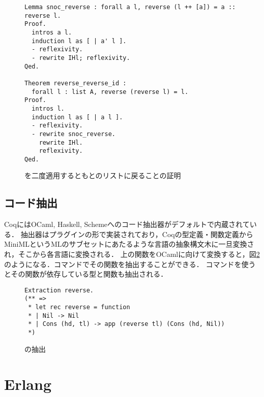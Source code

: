 \begin{figure}
\begin{lstlisting}
Lemma snoc_reverse : forall a l, reverse (l ++ [a]) = a :: reverse l.
Proof.
  intros a l.
  induction l as [ | a' l ].
  - reflexivity.
  - rewrite IHl; reflexivity.
Qed.

Theorem reverse_reverse_id :
  forall l : list A, reverse (reverse l) = l.
Proof.
  intros l.
  induction l as [ | a l ].
  - reflexivity.
  - rewrite snoc_reverse.
    rewrite IHl.
    reflexivity.
Qed.
\end{lstlisting}
\label{code:background:reverse-reverse}
\caption{を二度適用するともとのリストに戻ることの証明}
\end{figure}


\subsection{コード抽出}

CoqにはOCaml, Haskell, Schemeへのコード抽出器がデフォルトで内蔵されている．
抽出器はプラグインの形で実装されており，Coqの型定義・関数定義からMiniMLというMLのサブセットにあたるような言語の抽象構文木に一旦変換され，そこから各言語に変換される．
上の関数をOCamlに向けて変換すると，図\ref{code:background:reverse-erl}のようになる．コマンドでその関数を抽出することができる．
コマンドを使うとその関数が依存している型と関数も抽出される．

\begin{figure}
\begin{lstlisting}
Extraction reverse.
(** =>
 * let rec reverse = function
 * | Nil -> Nil
 * | Cons (hd, tl) -> app (reverse tl) (Cons (hd, Nil))
 *)
\end{lstlisting}
\label{code:background:reverse-erl}
\caption{の抽出}
\end{figure}



\section{Erlang}

